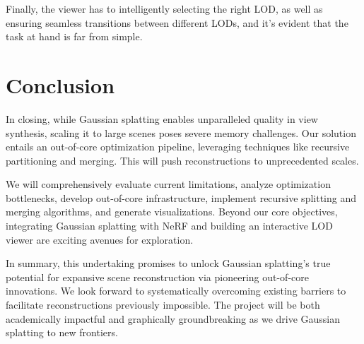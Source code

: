 \documentclass[logo,bsc,singlespacing,parskip]{infthesis}
\begin{document}
Finally, the viewer has to intelligently selecting the right LOD, as well as ensuring seamless transitions between different LODs, and it’s evident that the task at hand is far from simple.

\chapter{Conclusion}

In closing, while Gaussian splatting enables unparalleled quality in view synthesis, scaling it to large scenes poses severe memory challenges. Our solution entails an out-of-core optimization pipeline, leveraging techniques like recursive partitioning and merging. This will push reconstructions to unprecedented scales.

We will comprehensively evaluate current limitations, analyze optimization bottlenecks, develop out-of-core infrastructure, implement recursive splitting and merging algorithms, and generate visualizations. Beyond our core objectives, integrating Gaussian splatting with NeRF and building an interactive LOD viewer are exciting avenues for exploration.

In summary, this undertaking promises to unlock Gaussian splatting's true potential for expansive scene reconstruction via pioneering out-of-core innovations. We look forward to systematically overcoming existing barriers to facilitate reconstructions previously impossible. The project will be both academically impactful and graphically groundbreaking as we drive Gaussian splatting to new frontiers.


% 








\end{document}
